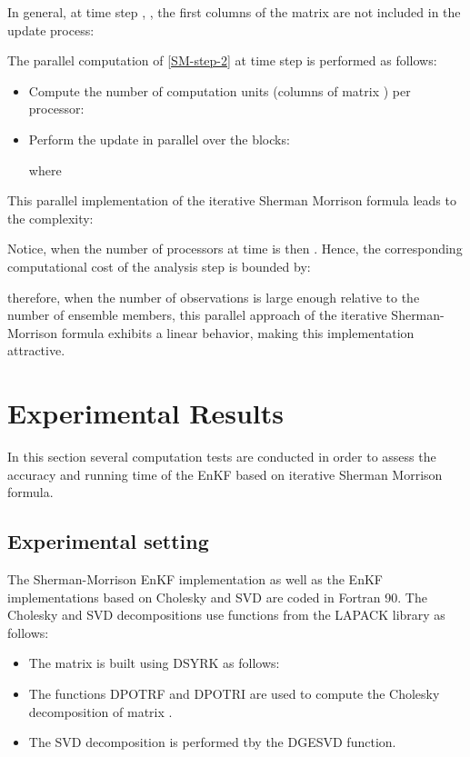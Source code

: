 \documentclass[12pt]{article}
\begin{document}
In general, at time step , , the first  columns of the matrix  are not included in the update process:

The parallel computation of \eqref{SM-step-2} at time step  is performed as follows:
\begin{itemize}
\item Compute the number of computation units (columns of matrix ) per processor:

\item Perform the update in parallel over the blocks:

where 

\end{itemize}

This parallel implementation of the iterative Sherman Morrison formula leads to the complexity:


Notice, when the number of processors at time  is  then . Hence, the corresponding computational cost of the analysis step is bounded by:

therefore, when the number of observations is large enough relative to the number of ensemble members, this parallel approach of the iterative Sherman-Morrison formula exhibits a linear behavior, making this implementation attractive. 

\section{Experimental Results}
\label{sec:results}


In this section several computation tests are conducted in order to assess the accuracy and running time of the EnKF based on iterative Sherman Morrison formula. 
\subsection{Experimental setting}
\label{Results:experimental-settings}


The Sherman-Morrison EnKF implementation as well as the EnKF implementations based on Cholesky and SVD are coded in Fortran 90. The Cholesky and SVD decompositions use functions from the LAPACK library \cite{Anderson90} as follows: 
\begin{itemize}
\item The matrix  is built using DSYRK as follows:

\item The functions DPOTRF and DPOTRI are used to compute the Cholesky decomposition of matrix .
\item The SVD decomposition is performed tby the DGESVD function.
\end{itemize}
\end{document}
